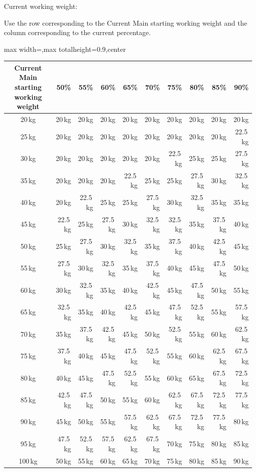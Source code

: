 \documentclass[11pt,a4paper]{article}
\newcommand{\tablearraystretch}{1.15}
\begin{document}
Current working weight:

Use the row corresponding to the Current Main starting working weight and the column corresponding to the current percentage.

\begin{center}
\renewcommand{\arraystretch}{\tablearraystretch}
\begin{adjustbox}{max width=\linewidth,max totalheight=0.9\textheight,center}
\begin{tabular}{crrrrrrrrr}
\toprule
Current Main starting working weight & 50\% & 55\% & 60\% & 65\% & 70\% & 75\% & 80\% & 85\% & 90\% \\
\midrule
20\,kg   & 20\,kg & 20\,kg & 20\,kg & 20\,kg & 20\,kg & 20\,kg & 20\,kg & 20\,kg & 20\,kg \\
25\,kg   & 20\,kg & 20\,kg & 20\,kg & 20\,kg & 20\,kg & 20\,kg & 20\,kg & 20\,kg & 22.5\,kg \\
30\,kg   & 20\,kg & 20\,kg & 20\,kg & 20\,kg & 20\,kg & 22.5\,kg & 25\,kg & 25\,kg & 27.5\,kg \\
35\,kg   & 20\,kg & 20\,kg & 20\,kg & 22.5\,kg & 25\,kg & 25\,kg & 27.5\,kg & 30\,kg & 32.5\,kg \\
40\,kg   & 20\,kg & 22.5\,kg & 25\,kg & 25\,kg & 27.5\,kg & 30\,kg & 32.5\,kg & 35\,kg & 35\,kg \\
45\,kg   & 22.5\,kg & 25\,kg & 27.5\,kg & 30\,kg & 32.5\,kg & 32.5\,kg & 35\,kg & 37.5\,kg & 40\,kg \\
50\,kg   & 25\,kg & 27.5\,kg & 30\,kg & 32.5\,kg & 35\,kg & 37.5\,kg & 40\,kg & 42.5\,kg & 45\,kg \\
55\,kg   & 27.5\,kg & 30\,kg & 32.5\,kg & 35\,kg & 37.5\,kg & 40\,kg & 45\,kg & 47.5\,kg & 50\,kg \\
60\,kg   & 30\,kg & 32.5\,kg & 35\,kg & 40\,kg & 42.5\,kg & 45\,kg & 47.5\,kg & 50\,kg & 55\,kg \\
65\,kg   & 32.5\,kg & 35\,kg & 40\,kg & 42.5\,kg & 45\,kg & 47.5\,kg & 52.5\,kg & 55\,kg & 57.5\,kg \\
70\,kg   & 35\,kg & 37.5\,kg & 42.5\,kg & 45\,kg & 50\,kg & 52.5\,kg & 55\,kg & 60\,kg & 62.5\,kg \\
75\,kg   & 37.5\,kg & 40\,kg & 45\,kg & 47.5\,kg & 52.5\,kg & 55\,kg & 60\,kg & 62.5\,kg & 67.5\,kg \\
80\,kg   & 40\,kg & 45\,kg & 47.5\,kg & 52.5\,kg & 55\,kg & 60\,kg & 65\,kg & 67.5\,kg & 72.5\,kg \\
85\,kg   & 42.5\,kg & 47.5\,kg & 50\,kg & 55\,kg & 60\,kg & 62.5\,kg & 67.5\,kg & 72.5\,kg & 77.5\,kg \\
90\,kg   & 45\,kg & 50\,kg & 55\,kg & 57.5\,kg & 62.5\,kg & 67.5\,kg & 72.5\,kg & 77.5\,kg & 80\,kg \\
95\,kg   & 47.5\,kg & 52.5\,kg & 57.5\,kg & 62.5\,kg & 67.5\,kg & 70\,kg & 75\,kg & 80\,kg & 85\,kg \\
100\,kg  & 50\,kg & 55\,kg & 60\,kg & 65\,kg & 70\,kg & 75\,kg & 80\,kg & 85\,kg & 90\,kg \\
\bottomrule
\end{tabular}
\end{adjustbox}
\renewcommand{\arraystretch}{1}
\end{center}
\end{document}
